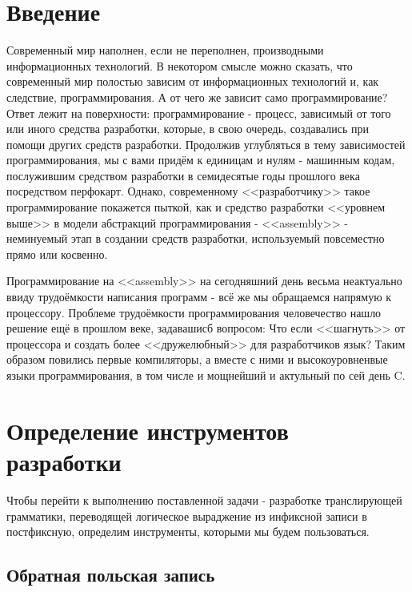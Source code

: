 \documentclass[12pt]{extarticle}
\begin{document}
	
	
	\tableofcontents
	
	\newpage
	
	\begin{sloppypar}	
	
	\section{Введение}
	
	Современный мир наполнен, если не переполнен, производными информационных технологий. В некотором смысле можно сказать, что современный мир полостью зависим от информационных технологий и, как следствие, программирования. А от чего же зависит само программирование? Ответ лежит на поверхности: программирование - процесс, зависимый от того или иного средства разработки, которые, в свою очередь, создавались при помощи других средств разработки. Продолжив углубляться в тему зависимостей программирования, мы с вами придём к единицам и нулям - машинным кодам, послужившим средством разработки в семидесятые годы прошлого века посредством перфокарт. Однако, современному <<разработчику>> такое программирование покажется пыткой, как и средство разработки <<уровнем выше>> в модели абстракций программирования - <<assembly>> - неминуемый этап в создании средств разработки, используемый повсеместно прямо или косвенно.
	
	\par
	
	Программирование на <<assembly>> на сегодняшний день весьма неактуально ввиду трудоёмкости написания программ - всё же мы обращаемся напрямую к процессору. Проблеме трудоёмкости программирования человечество нашло решение ещё в прошлом веке, задавашисб вопросом: Что если <<шагнуть>> от процессора и создать более <<дружелюбный>> для разработчиков язык? Таким образом повились первые компиляторы, а вместе с ними и высокоуровненвые языки программирования, в том числе и мощнейший и актульный по сей день C.
	
	\section{Определение инструментов разработки}
	
	Чтобы перейти к выполнению поставленной задачи - разработке транслирующей грамматики, переводящей логическое выраджение из инфиксной записи в постфиксную, определим инструменты, которыми мы будем пользоваться.
	
	\subsection{Обратная польская запись}
	

\end{sloppypar}
\end{document}
